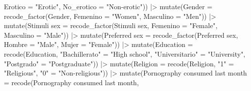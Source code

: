 \documentclass[
  bookmarksnumbered]{article}
\newenvironment{Shaded}{\begin{snugshade}}{\end{snugshade}}
\newcommand{\AttributeTok}[1]{\textcolor[rgb]{0.80,0.80,0.80}{#1}}
\newcommand{\FunctionTok}[1]{\textcolor[rgb]{0.94,0.94,0.56}{#1}}
\newcommand{\NormalTok}[1]{\textcolor[rgb]{0.80,0.80,0.80}{#1}}
\newcommand{\OtherTok}[1]{\textcolor[rgb]{0.94,0.94,0.56}{#1}}
\newcommand{\SpecialCharTok}[1]{\textcolor[rgb]{0.86,0.64,0.64}{#1}}
\newcommand{\StringTok}[1]{\textcolor[rgb]{0.80,0.58,0.58}{#1}}
\begin{document}
\begin{Shaded}
\begin{Highlighting}[]
                                            \AttributeTok{Erotico =} \StringTok{"Erotic"}\NormalTok{, }
                                            \AttributeTok{No\_erotico =} \StringTok{"Non{-}erotic"}\NormalTok{)) }\SpecialCharTok{|\textgreater{}} 
  \FunctionTok{mutate}\NormalTok{(}\AttributeTok{Gender =} \FunctionTok{recode\_factor}\NormalTok{(Gender, }
                                \AttributeTok{Femenino =} \StringTok{"Women"}\NormalTok{, }
                                \AttributeTok{Masculino =} \StringTok{"Men"}\NormalTok{)) }\SpecialCharTok{|\textgreater{}}
  \FunctionTok{mutate}\NormalTok{(}\StringTok{\textasciigrave{}}\AttributeTok{Stimuli sex}\StringTok{\textasciigrave{}} \OtherTok{=} \FunctionTok{recode\_factor}\NormalTok{(}\StringTok{\textasciigrave{}}\AttributeTok{Stimuli sex}\StringTok{\textasciigrave{}}\NormalTok{,}
                                       \AttributeTok{Femenino =} \StringTok{"Female"}\NormalTok{, }
                                       \AttributeTok{Masculino =} \StringTok{"Male"}\NormalTok{)) }\SpecialCharTok{|\textgreater{}}
  \FunctionTok{mutate}\NormalTok{(}\StringTok{\textasciigrave{}}\AttributeTok{Preferred sex}\StringTok{\textasciigrave{}} \OtherTok{=} \FunctionTok{recode\_factor}\NormalTok{(}\StringTok{\textasciigrave{}}\AttributeTok{Preferred sex}\StringTok{\textasciigrave{}}\NormalTok{,}
                                         \AttributeTok{Hombre =} \StringTok{"Male"}\NormalTok{, }
                                         \AttributeTok{Mujer =} \StringTok{"Female"}\NormalTok{)) }\SpecialCharTok{|\textgreater{}}
  \FunctionTok{mutate}\NormalTok{(}\AttributeTok{Education =} \FunctionTok{recode}\NormalTok{(Education,}
                            \StringTok{"Bachillerato"} \OtherTok{=} \StringTok{"High school"}\NormalTok{,}
                            \StringTok{"Universitario"} \OtherTok{=} \StringTok{"University"}\NormalTok{,}
                            \StringTok{"Postgrado"} \OtherTok{=} \StringTok{"Postgraduate"}\NormalTok{)) }\SpecialCharTok{|\textgreater{}}
  \FunctionTok{mutate}\NormalTok{(}\AttributeTok{Religion =} \FunctionTok{recode}\NormalTok{(Religion,}
                           \StringTok{"1"} \OtherTok{=} \StringTok{"Religious"}\NormalTok{,}
                           \StringTok{"0"} \OtherTok{=} \StringTok{"Non{-}religious"}\NormalTok{)) }\SpecialCharTok{|\textgreater{}}
  \FunctionTok{mutate}\NormalTok{(}\StringTok{\textasciigrave{}}\AttributeTok{Pornography consumed last month}\StringTok{\textasciigrave{}} \OtherTok{=} \FunctionTok{recode}\NormalTok{(}\StringTok{\textasciigrave{}}\AttributeTok{Pornography consumed last month}\StringTok{\textasciigrave{}}\NormalTok{,}

\end{Highlighting}
\end{Shaded}
\end{document}
